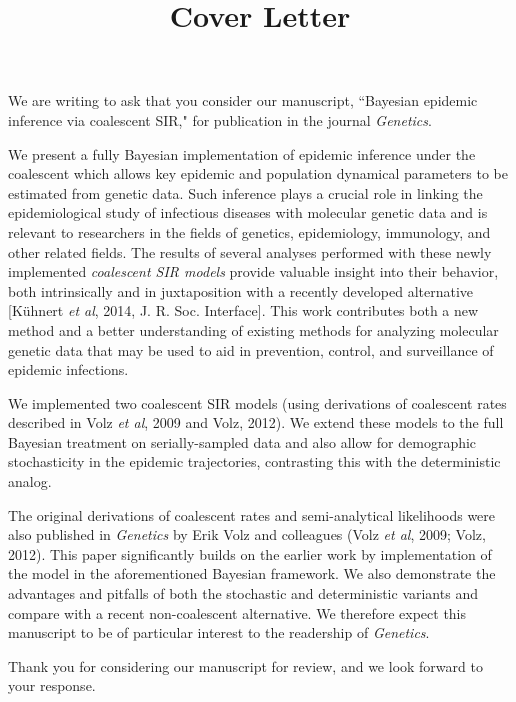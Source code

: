 \documentclass[10.5pt]{article}
\title{Cover Letter}
\date{}
\begin{document}
\maketitle{}

\vspace{3mm}

We are writing to ask that you consider our manuscript, ``Bayesian epidemic inference via coalescent SIR," for 
publication in the journal \textit{Genetics}.

We present a fully Bayesian implementation of epidemic inference under the coalescent which allows key epidemic and population dynamical parameters to be estimated from genetic data.  
Such inference plays a crucial role in linking the epidemiological study of infectious diseases with molecular genetic data and is relevant 
to researchers in the fields of genetics, epidemiology, immunology, and other related fields. 
The results of several analyses performed with these newly implemented {\it coalescent SIR models} provide valuable insight into their behavior, 
both intrinsically and in juxtaposition with a recently developed alternative [K\"uhnert {\it et al}, 2014, J. R. Soc. Interface].  This work contributes both a new method and a better understanding of existing
methods for analyzing molecular genetic data that may be used to aid in prevention, control, and surveillance of epidemic infections.  

We implemented two coalescent SIR models (using derivations of coalescent rates described in Volz {\it et al}, 2009 and Volz, 2012).
We extend these models to the full Bayesian treatment on serially-sampled data and also allow for demographic stochasticity in the epidemic trajectories, contrasting this with the deterministic analog. 

The original derivations of coalescent rates and semi-analytical likelihoods were also published in \textit{Genetics} by Erik Volz and colleagues (Volz {\it et al}, 2009; Volz, 2012).  This paper significantly builds on the earlier work by implementation of the model in the aforementioned Bayesian framework. We also demonstrate the advantages and pitfalls of both the 
stochastic and deterministic variants and compare with a recent non-coalescent alternative. We therefore expect this manuscript to be of particular interest to the readership of \textit{Genetics}.  

\vspace{1mm}
Thank you for considering our manuscript for review, and we look forward to your response.
\end{document}
